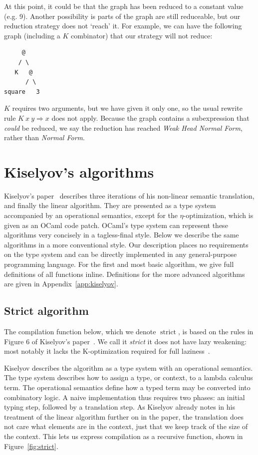 \documentclass[conference]{IEEEtran}
\DeclareMathOperator{\strict}{strict}
\begin{document}
At this point, it could be that the graph has been reduced to a constant value (e.g. 9).
Another possibility is parts of the graph are still reduceable, but our reduction strategy does not `reach' it.
For example, we can have the following graph (including a $K$ combinator) that our strategy will not reduce:

\begin{verbatim}
     @
    / \
   K   @
      / \
square   3
\end{verbatim}

$K$ requires two arguments, but we have given it only one, so the usual rewrite rule $K\ x\ y \Rightarrow x$ does not apply.
Because the graph contains a subexpression that \emph{could} be reduced, we say the reduction has reached \emph{Weak Head Normal Form}, rather than \emph{Normal Form}.

\section{Kiselyov's algorithms}
\label{sec:kiselyov}
Kiselyov's paper~\cite{kiselyov_lambda_2018} describes three iterations of his non-linear semantic translation, and finally the linear algorithm.
They are presented as a type system accompanied by an operational semantics, except for the $\eta$-optimization, which is given as an OCaml code patch.
OCaml's type system can represent these algorithms very concisely in a tagless-final style.
Below we describe the same algorithms in a more conventional style.
Our description places no requirements on the type system and can be directly implemented in any general-purpose programming language.
For the first and most basic algorithm, we give full definitions of all functions inline.
Definitions for the more advanced algorithms are given in Appendix~\ref{app:kiselyov}.

\subsection{Strict algorithm}
The compilation function below, which we denote $\strict$, is based on the rules in Figure 6 of Kiselyov's paper~\cite{kiselyov_lambda_2018}.
We call it \textit{strict} it does not have lazy weakening: most notably it lacks the K-optimization required for full laziness~\cite{spj_impl}.

Kiselyov describes the algorithm as a type system with an operational semantics.
The type system describes how to assign a type, or context, to a lambda calculus term.
The operational semantics define how a typed term may be converted into combinatory logic.
A naive implementation thus requires two phases: an initial typing step, followed by a translation step.
As Kiselyov already notes in his treatment of the linear algorithm further on in the paper, the translation does not care what elements are in the context, just that we keep track of the size of the context.
This lets us express compilation as a recursive function, shown in Figure~\ref{fig:strict}.
\end{document}
